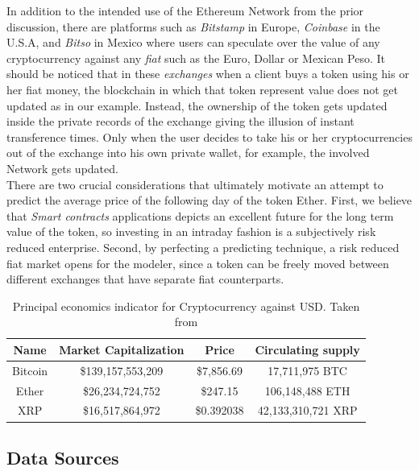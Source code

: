 In addition to the intended use of the Ethereum Network from the prior discussion, there are platforms such as \emph{Bitstamp} in Europe, \emph{Coinbase} in the U.S.A, and \emph{Bitso} in Mexico where users can speculate over the value of any cryptocurrency against any \emph{fiat} such as the Euro, Dollar or Mexican Peso. It should be noticed that in these \emph{exchanges} when a client buys a token using his or her fiat money, the blockchain in which that token represent value does not get updated as in our example. Instead, the ownership of the token gets updated inside the private records of the exchange giving the illusion of instant transference times. Only when the user decides to take his or her cryptocurrencies out of the exchange into his own private wallet, for example, the involved Network gets updated.\\

There are two crucial considerations that ultimately motivate an attempt to predict the average price of the following day of the token Ether. First, we believe that \emph{Smart contracts} applications depicts an excellent future for the long term value of the token, so investing in an intraday fashion is a subjectively risk reduced enterprise. Second, by perfecting a predicting technique, a risk reduced fiat market opens for the modeler, since a token can be freely moved between different exchanges that have separate fiat counterparts.


\begin{table}[h!]
\begin{center}
\begin{tabular}{||c c c  c||} 
\hline
Name & Market Capitalization & Price  & Circulating supply\\ [0.5ex] 
\hline\hline
Bitcoin & \$139,157,553,209 & \$7,856.69& 17,711,975 BTC \\ 
\hline
Ether& \$26,234,724,752 & \$247.15 &  106,148,488 ETH  \\ 
\hline
XRP & \$16,517,864,972 & \$0.392038 &  42,133,310,721 XRP  \\
\hline
\end{tabular}
\caption{Principal economics indicator for Cryptocurrency against USD. Taken from \cite{coin}}
\label{table:cripto_markets}
\end{center}
\end{table}




\subsection{Data Sources}


